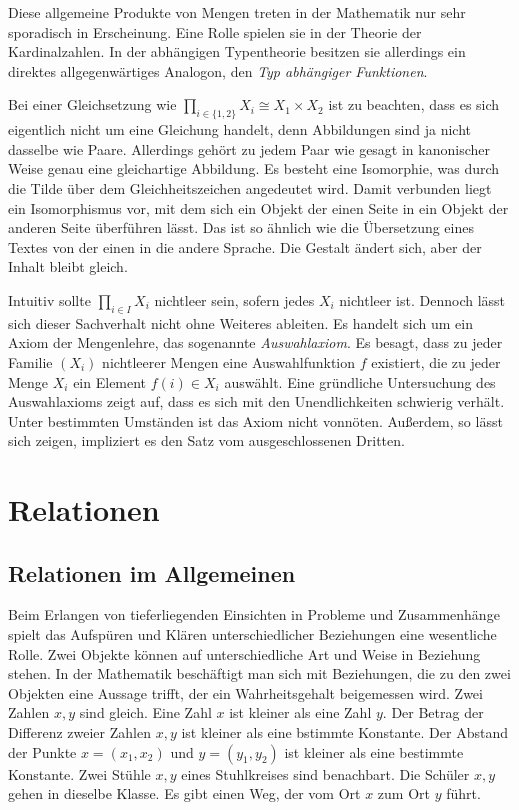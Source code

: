 Diese allgemeine Produkte von Mengen treten in der Mathematik nur sehr
sporadisch in Erscheinung. Eine Rolle spielen sie in der Theorie der
Kardinalzahlen. In der abhängigen Typentheorie besitzen sie allerdings ein
direktes allgegenwärtiges Analogon, den \emph{Typ abhängiger Funktionen}.

Bei einer Gleichsetzung wie $\prod_{i\in\{1,2\}} X_i\cong X_1\times X_2$ ist
zu beachten, dass es sich eigentlich nicht um eine Gleichung handelt, denn
Abbildungen sind ja nicht dasselbe wie Paare. Allerdings gehört zu jedem
Paar wie gesagt in kanonischer Weise genau eine gleichartige Abbildung.
Es besteht eine Isomorphie, was durch die Tilde über dem Gleichheitszeichen
angedeutet wird. Damit verbunden liegt ein Isomorphismus vor, mit dem
sich ein Objekt der einen Seite in ein Objekt der anderen Seite
überführen lässt. Das ist so ähnlich wie die Übersetzung eines Textes
von der einen in die andere Sprache. Die Gestalt ändert sich, aber der
Inhalt bleibt gleich.

Intuitiv sollte $\prod_{i\in I} X_i$ nichtleer sein, sofern jedes $X_i$
nichtleer ist. Dennoch lässt sich dieser Sachverhalt nicht ohne Weiteres
ableiten. Es handelt sich um ein Axiom der Mengenlehre, das sogenannte
\emph{Auswahlaxiom}. Es besagt, dass zu jeder
Familie $(X_i)$ nichtleerer Mengen eine Auswahlfunktion $f$ existiert,
die zu jeder Menge $X_i$ ein Element $f(i)\in X_i$ auswählt.
Eine gründliche Untersuchung des Auswahlaxioms zeigt auf, dass es sich
mit den Unendlichkeiten schwierig verhält. Unter bestimmten Umständen
ist das Axiom nicht vonnöten. Außerdem, so lässt sich zeigen, impliziert
es den Satz vom ausgeschlossenen Dritten.

\section{Relationen}

\subsection{Relationen im Allgemeinen}

Beim Erlangen von tieferliegenden Einsichten in Probleme und
Zusammenhänge spielt das Aufspüren und Klären unterschiedlicher
Beziehungen eine wesentliche Rolle. Zwei Objekte können auf
unterschiedliche Art und Weise in Beziehung stehen. In der Mathematik
beschäftigt man sich mit Beziehungen, die zu den zwei Objekten eine
Aussage trifft, der ein Wahrheitsgehalt beigemessen wird. Zwei Zahlen
$x,y$ sind gleich. Eine Zahl $x$ ist kleiner als eine Zahl $y$. Der
Betrag der Differenz zweier Zahlen $x,y$ ist kleiner als eine bstimmte
Konstante. Der Abstand der Punkte $x=(x_1,x_2)$ und $y=(y_1,y_2)$ ist
kleiner als eine bestimmte Konstante. Zwei Stühle $x,y$ eines
Stuhlkreises sind benachbart. Die Schüler $x,y$ gehen in dieselbe
Klasse. Es gibt einen Weg, der vom Ort $x$ zum Ort $y$ führt.


